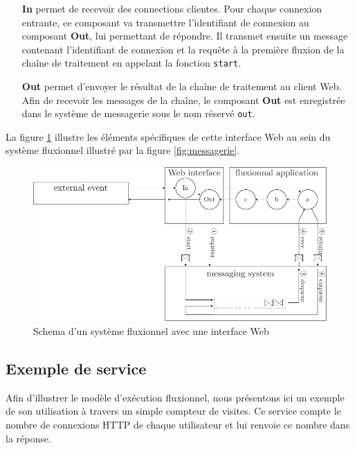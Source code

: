 \begin{itemize}
	\item[\textbf{In}]
    permet de recevoir des connections clientes.
    Pour chaque connexion entrante, ce composant va transmettre l'identifiant de connexion au composant \textbf{Out}, lui permettant de répondre.
    Il transmet ensuite un message contenant l'identifiant de connexion et la requête à la première fluxion de la chaîne de traitement en appelant la fonction \texttt{start}.
	\item[\textbf{Out}]
    permet d'envoyer le résultat de la chaîne de traitement au client Web.
    Afin de recevoir les messages de la chaîne, le composant \textbf{Out} est enregistrée dans le système de messagerie sous le nom réservé \texttt{out}.
\end{itemize}


La figure \ref{fig:schemaweb} illustre les éléments spécifiques de cette interface Web au sein du système fluxionnel illustré par la figure \ref{fig:messagerie}.

\begin{figure}[h!]
	\includegraphics[width=\linewidth]{schema-web.pdf}
	\caption{Schema d'un système fluxionnel avec une interface Web}
	\label{fig:schemaweb}
\end{figure}


\subsection{Exemple de service}

Afin d'illustrer le modèle d'exécution fluxionnel, nous présentons ici un exemple de son utilisation à travers un simple compteur de visites.
Ce service compte le nombre de connexions HTTP de chaque utilisateur et lui renvoie ce nombre dans la réponse.

